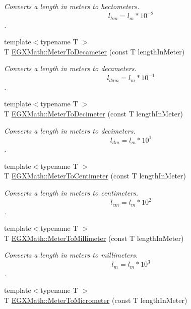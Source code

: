 \begin{DoxyCompactItemize}
\begin{DoxyCompactList}\small\item\em Converts a length in meters to hectometers. \[ l_{hm}=l_{m} * 10^{-2} \]. \end{DoxyCompactList}\item 
{\footnotesize template$<$typename T $>$ }\\T \mbox{\hyperlink{group___e_g_x_math-_conversions-_length_conversions-_meter-_s_i_ga1b18e63d03025512566c5f55ad4e0c89}{E\+G\+X\+Math\+::\+Meter\+To\+Decameter}} (const T length\+In\+Meter)
\begin{DoxyCompactList}\small\item\em Converts a length in meters to decameters. \[ l_{dam}=l_{m} * 10^{-1} \]. \end{DoxyCompactList}\item 
{\footnotesize template$<$typename T $>$ }\\T \mbox{\hyperlink{group___e_g_x_math-_conversions-_length_conversions-_meter-_s_i_ga4caa9cd21d4f78039b1ceddf1f0ea5fd}{E\+G\+X\+Math\+::\+Meter\+To\+Decimeter}} (const T length\+In\+Meter)
\begin{DoxyCompactList}\small\item\em Converts a length in meters to decimeters. \[ l_{dm}=l_{m} * 10^{1} \]. \end{DoxyCompactList}\item 
{\footnotesize template$<$typename T $>$ }\\T \mbox{\hyperlink{group___e_g_x_math-_conversions-_length_conversions-_meter-_s_i_gab70c34d0ee4bf48225d48e48b28f808a}{E\+G\+X\+Math\+::\+Meter\+To\+Centimeter}} (const T length\+In\+Meter)
\begin{DoxyCompactList}\small\item\em Converts a length in meters to centimeters. \[ l_{cm}=l_{m} * 10^{2} \]. \end{DoxyCompactList}\item 
{\footnotesize template$<$typename T $>$ }\\T \mbox{\hyperlink{group___e_g_x_math-_conversions-_length_conversions-_meter-_s_i_ga9bd519d9f6b1a52f85e7817f4f81690b}{E\+G\+X\+Math\+::\+Meter\+To\+Millimeter}} (const T length\+In\+Meter)
\begin{DoxyCompactList}\small\item\em Converts a length in meters to millimeters. \[ l_{m}=l_{m} * 10^{3} \]. \end{DoxyCompactList}\item 
{\footnotesize template$<$typename T $>$ }\\T \mbox{\hyperlink{group___e_g_x_math-_conversions-_length_conversions-_meter-_s_i_gac0114c26af780ce603948df83f5e338e}{E\+G\+X\+Math\+::\+Meter\+To\+Micrometer}} (const T length\+In\+Meter)

\end{DoxyCompactItemize}
